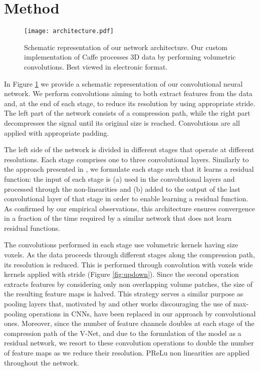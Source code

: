 \documentclass{llncs}
\begin{document}
\section{Method}
\label{sec:method}

\begin{figure} 	
\centering 	
\texttt{[image: architecture.pdf]} 	
\caption{Schematic representation of our network architecture. Our custom implementation of Caffe \cite{jia2014caffe} processes 3D data by performing volumetric convolutions. Best viewed in electronic format.} \label{fig:VnetImage} 
\end{figure}

In Figure \ref{fig:VnetImage} we provide a schematic representation of our convolutional neural network. 
We perform convolutions aiming to both extract features from the data and, at the end of each stage, to reduce its resolution by using appropriate stride. The left part of the network consists of a compression path, while the right part decompresses the signal until its original size is reached. Convolutions are all applied with appropriate padding.

The left side of the network is divided in different stages that operate at different resolutions. Each stage comprises one to three convolutional layers. Similarly to the approach presented in \cite{he2015deep}, we formulate each stage such that it learns a residual function: the input of each stage is (a) used in the convolutional layers and processed through the non-linearities and (b) added to the output of the last convolutional layer of that stage in order to enable learning a residual function. As confirmed by our empirical observations, this architecture ensures convergence in a fraction of the time required by a similar network that does not learn residual functions. 

The convolutions performed in each stage use volumetric kernels having size  voxels.
As the data proceeds through different stages along the compression path, its resolution is reduced. This is performed through convolution with  voxels wide kernels applied with stride  (Figure \ref{fig:updown}). Since the second operation extracts features by considering only non overlapping  volume patches, the size of the resulting feature maps is halved. 
This strategy serves a similar purpose as pooling layers that, motivated by \cite{springenberg2014striving} and other works discouraging the use of max-pooling operations in CNNs, have been replaced in our approach by convolutional ones. Moreover, since the number of feature channels doubles at each stage of the compression path of the V-Net, and due to the formulation of the model as a residual network, we resort to these convolution operations to double the number of feature maps as we reduce their resolution. PReLu non linearities are applied throughout the network.
\end{document}
